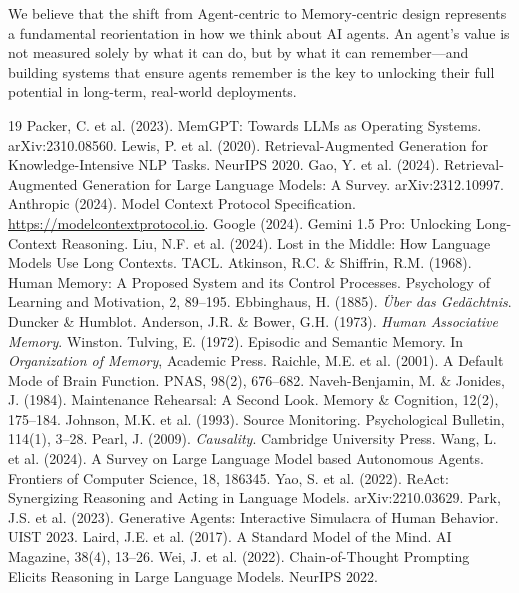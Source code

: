 \documentclass[11pt]{article}
\begin{document}
We believe that the shift from Agent-centric to Memory-centric design represents a fundamental reorientation in how we think about AI agents. An agent's value is not measured solely by what it can do, but by what it can remember---and building systems that ensure agents remember is the key to unlocking their full potential in long-term, real-world deployments.


\begin{thebibliography}{19}
 Packer, C. et al. (2023). MemGPT: Towards LLMs as Operating Systems. arXiv:2310.08560.
 Lewis, P. et al. (2020). Retrieval-Augmented Generation for Knowledge-Intensive NLP Tasks. NeurIPS 2020.
 Gao, Y. et al. (2024). Retrieval-Augmented Generation for Large Language Models: A Survey. arXiv:2312.10997.
 Anthropic (2024). Model Context Protocol Specification. \url{https://modelcontextprotocol.io}.
 Google (2024). Gemini 1.5 Pro: Unlocking Long-Context Reasoning.
 Liu, N.F. et al. (2024). Lost in the Middle: How Language Models Use Long Contexts. TACL.
 Atkinson, R.C. \& Shiffrin, R.M. (1968). Human Memory: A Proposed System and its Control Processes. Psychology of Learning and Motivation, 2, 89--195.
 Ebbinghaus, H. (1885). \emph{\"Uber das Ged\"achtnis}. Duncker \& Humblot.
 Anderson, J.R. \& Bower, G.H. (1973). \emph{Human Associative Memory}. Winston.
 Tulving, E. (1972). Episodic and Semantic Memory. In \emph{Organization of Memory}, Academic Press.
 Raichle, M.E. et al. (2001). A Default Mode of Brain Function. PNAS, 98(2), 676--682.
 Naveh-Benjamin, M. \& Jonides, J. (1984). Maintenance Rehearsal: A Second Look. Memory \& Cognition, 12(2), 175--184.
 Johnson, M.K. et al. (1993). Source Monitoring. Psychological Bulletin, 114(1), 3--28.
 Pearl, J. (2009). \emph{Causality}. Cambridge University Press.
 Wang, L. et al. (2024). A Survey on Large Language Model based Autonomous Agents. Frontiers of Computer Science, 18, 186345.
 Yao, S. et al. (2022). ReAct: Synergizing Reasoning and Acting in Language Models. arXiv:2210.03629.
 Park, J.S. et al. (2023). Generative Agents: Interactive Simulacra of Human Behavior. UIST 2023.
 Laird, J.E. et al. (2017). A Standard Model of the Mind. AI Magazine, 38(4), 13--26.
 Wei, J. et al. (2022). Chain-of-Thought Prompting Elicits Reasoning in Large Language Models. NeurIPS 2022.
\end{thebibliography}
\end{document}
